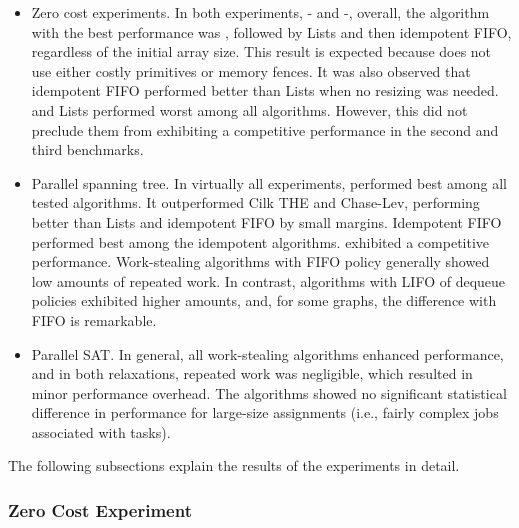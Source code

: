 \begin{itemize}
\item Zero cost experiments. In both experiments, \Puts{}-\Takes{} and \Puts-\Steals{}, overall, the algorithm with the best performance was \NCWSM, followed by \NCWSM Lists and then idempotent FIFO, regardless of the initial array size. This result is expected because \NCWSM does not use either costly primitives or memory fences. It was also observed that idempotent FIFO performed better than \NCWSM Lists when no resizing was needed. \BNCWSM and \BNCWSM Lists performed worst among all algorithms. However, this did not preclude them from exhibiting a competitive performance in the second and third benchmarks.

\item Parallel spanning tree. In virtually all experiments, \NCWSM performed best among all tested algorithms. It outperformed Cilk THE and Chase-Lev, performing better than \NCWSM Lists and idempotent FIFO by small margins. Idempotent FIFO performed best among the idempotent algorithms.  \BNCWSM exhibited a competitive performance. Work-stealing algorithms with FIFO policy generally showed low amounts of repeated work. In contrast, algorithms with LIFO of dequeue policies exhibited higher amounts, and, for some graphs, the difference with FIFO is remarkable.

\item Parallel SAT. In general, all work-stealing algorithms enhanced performance, and in both relaxations, repeated work was negligible, which resulted in minor performance overhead. The algorithms showed no significant statistical difference in performance for large-size assignments (i.e., fairly complex jobs associated with tasks).

\end{itemize}

The following subsections explain the results of the experiments in detail.

\subsubsection{Zero Cost Experiment}


